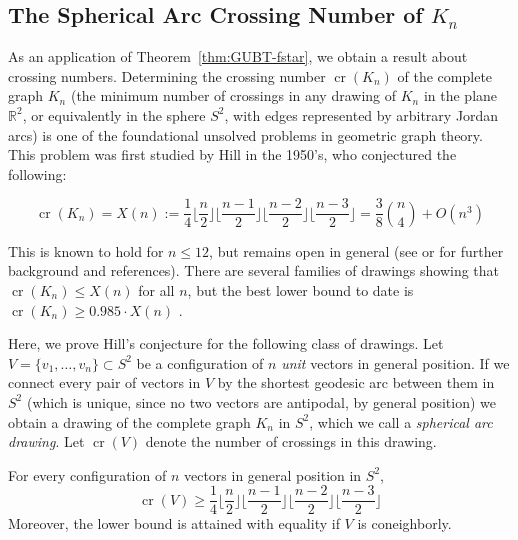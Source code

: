 \documentclass[a4paper,USenglish,cleveref, autoref, thm-restate,nolineno]{socg-lipics-v2021}
\DeclareMathOperator{\cross}{cr}
\renewcommand{\leq}{\leqslant}
\renewcommand{\geq}{\geqslant}
\newcommand{\R}{\mathbb{R}}
\begin{document}
\subsection{The Spherical Arc Crossing Number of $K_n$}
\label{subsec:crossing}
As an application of Theorem~\ref{thm:GUBT-fstar}, we obtain a result about crossing numbers. Determining the crossing number $\cross(K_n)$ of the complete graph $K_n$ (the minimum number of crossings in any drawing of $K_n$ in the plane $\R^2$, or equivalently in the sphere $S^2$, with edges represented by arbitrary Jordan arcs) is one of the foundational unsolved problems in geometric graph theory. This problem was first studied by Hill in the 1950's, who conjectured the following: 
\begin{conjecture}[Hill]
\begin{equation}
\label{conj:Hill}
\cross(K_n)=X(n):=\frac{1}{4}\Big\lfloor \frac{n}{2}\Big\rfloor \Big\lfloor \frac{n-1}{2} \Big\rfloor \Big\lfloor \frac{n-2}{2} \Big\rfloor \Big\lfloor \frac{n-3}{2}\Big\rfloor =\frac{3}{8}\binom{n}{4}+O(n^3)
\end{equation}
\end{conjecture}
This is known to hold for $n\leq 12$, but remains open in general (see \cite[Sec.~1.3]{Schaefer:2018aa} or \cite{Szekely:2016aa} for further background and references). There are several families of drawings showing that $\cross(K_n)\leq X(n)$ for all $n$, but the best lower bound to date is %
$\cross(K_n) \geq 0.985 \cdot X(n)$  \cite{Balogh:2019aa}.

Here, we prove Hill's conjecture for the following class of drawings. Let $V=\{v_1,\dots,v_n\} \subset S^2$ be a configuration of $n$ \emph{unit} vectors in general position. If we connect every pair of vectors in $V$ by the shortest geodesic arc between them in $S^2$ (which is unique, since no two vectors are antipodal, by general position) we obtain a drawing of the complete graph $K_n$ in $S^2$, which we call a \emph{spherical arc drawing}. Let 
$\cross(V)$ 
denote the number of crossings in this drawing.
\begin{theorem} 
\label{thm:crossings}
For every configuration of $n$ vectors in general position in $S^2$, 
\[\cross(V) \geq \frac{1}{4}\Big\lfloor \frac{n}{2}\Big\rfloor \Big\lfloor \frac{n-1}{2} \Big\rfloor \Big\lfloor \frac{n-2}{2} \Big\rfloor \Big\lfloor \frac{n-3}{2}\Big\rfloor
\]
Moreover, the lower bound is attained with equality if $V$ is coneighborly.
\end{theorem}
\end{document}
